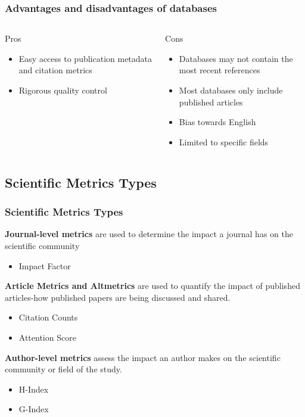 \documentclass{beamer}
\newcommand{\pros}{\item[{\textcolor[HTML]{3C8031}{\ding{51}}}]}
\newcommand{\cons}{\item[\textcolor{red}{\ding{54}}]}
\begin{document}
\begin{frame}
    \frametitle{Advantages and disadvantages of databases}
    \begin{columns}[T]
        \begin{column}{.5\textwidth}
            \centering Pros
            \begin{itemize}[<+->]
                \pros Easy access to publication metadata and citation metrics
                \pros Rigorous quality control
            \end{itemize}
        \end{column}
        \begin{column}{.5\textwidth}
            \centering Cons
            \begin{itemize}[<+->]
                \cons Databases may not contain the most recent references
                \cons Most databases only include published articles
                \cons Bias towards English
                \cons Limited to specific fields
            \end{itemize}
        \end{column}
    \end{columns}
\end{frame}

\subsection{Scientific Metrics Types}
\begin{frame}
    \frametitle{Scientific Metrics Types}
    \textbf{Journal-level metrics} are used to determine the impact a journal has on the scientific community
    \begin{itemize}
        \item Impact Factor
    \end{itemize}
    \textbf{Article Metrics and Altmetrics} are used to quantify the impact of published articles-how published papers are being discussed and shared.
    \begin{itemize}
        \item Citation Counts
        \item Attention Score
    \end{itemize}
    \textbf{Author-level metrics} assess the impact an author makes on the scientific community or field of the study.
    \begin{itemize}
        \item H-Index
        \item G-Index
    \end{itemize}
\end{frame}
\end{document}

